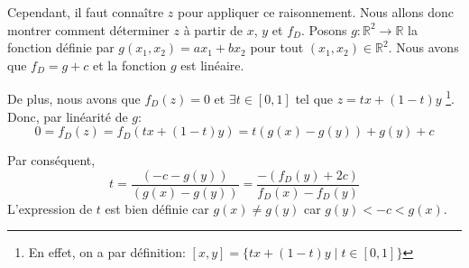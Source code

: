 Cependant, il faut connaître $z$ pour appliquer ce raisonnement. Nous allons
donc montrer comment déterminer $z$ à partir de $x$, $y$ et $f_D$.
Posons $g: \mathbb{R}^2 \to \mathbb{R}$ la fonction définie par
$g (x_1, x_2) =  a x_1 + b x_2$ pour tout $(x_1, x_2)\in\mathbb{R}^2$.
Nous avons que $f_D = g + c $ et la fonction $g$ est linéaire.

De plus, nous avons que $f_D(z) = 0$ et $\exists t \in [0,1]$ tel que
$ z = tx+ (1-t)y$
\footnote{En effet, on a par définition: $[x, y] = \{tx + (1 - t)y\mid t\in [0,1]\}$}.
Donc, par linéarité de $g$:
\begin{equation}
  0 = f_D(z)  = f_D (tx+ (1-t)y) = t(g(x)-g(y))+g(y)+c
\end{equation}

Par conséquent,
\begin{equation} \label{eq:t}
    t = \frac{(-c - g(y))}{(g(x)-g(y))} = \frac{-(f_D(y)+2c)}{f_D(x)-f_D(y)}
\end{equation}
L'expression de $t$ est bien définie car  $g(x) \neq g(y)$ car
$ g(y) < -c < g(x)$.
